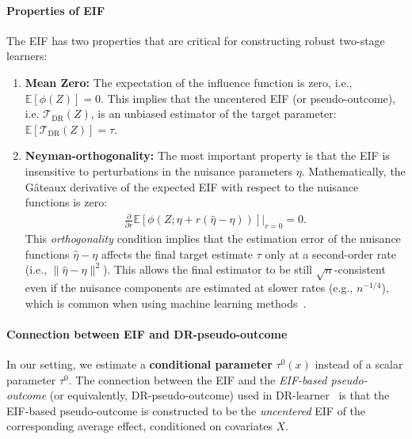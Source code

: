 \documentclass{article}
\theoremstyle{plain}
\theoremstyle{definition}
\theoremstyle{remark}
\newcommand{\1}{\mathds{1}}                %
\begin{document}
\paragraph{Properties of EIF}
The EIF has two properties that are critical for constructing robust two-stage learners:
\begin{enumerate}
    \item \textbf{Mean Zero:} The expectation of the influence function is zero, i.e., $\mathbb{E}[\phi(Z)] = 0$. This implies that the uncentered EIF (or pseudo-outcome), i.e. $\mathcal{T}_\mathrm{DR}(Z)$, is an unbiased estimator of the target parameter: $\mathbb{E}[\mathcal{T}_\mathrm{DR}(Z)] = \tau$.
    
    \item \textbf{Neyman-orthogonality:} The most important property is that the EIF is insensitive to perturbations in the nuisance parameters $\eta$. Mathematically, the G\^ateaux derivative of the expected EIF with respect to the nuisance functions is zero:
    \begin{align}
        \frac{\partial}{\partial r} \mathbb{E}\left[ \phi(Z; \eta + r(\hat{\eta} - \eta)) \right] \bigg|_{r=0} = 0.
    \end{align}
    This \emph{orthogonality} condition implies that the estimation error of the nuisance functions $\hat{\eta} - \eta$ affects the final target estimate $\tau$ only at a second-order rate (i.e., $\|\hat{\eta} - \eta\|^2$). This allows the final estimator to be still $\sqrt{n}$-consistent even if the nuisance components are estimated at slower rates (e.g., $n^{-1/4}$), which is common when using machine learning methods~\cite{Chernozhukov.2018}.
\end{enumerate}


\paragraph{Connection between EIF and DR-pseudo-outcome}
In our setting, we estimate a \textbf{conditional parameter} $\tau^0(x)$ instead of a scalar parameter $\tau^0$. The connection between the EIF and the \emph{EIF-based pseudo-outcome} (or equivalently, DR-pseudo-outcome) used in DR-learner~\cite{Kennedy.2020-DR-learner} is that the EIF-based pseudo-outcome is constructed to be the \textit{uncentered} EIF of the corresponding average effect, conditioned on covariates $X$.
\end{document}
